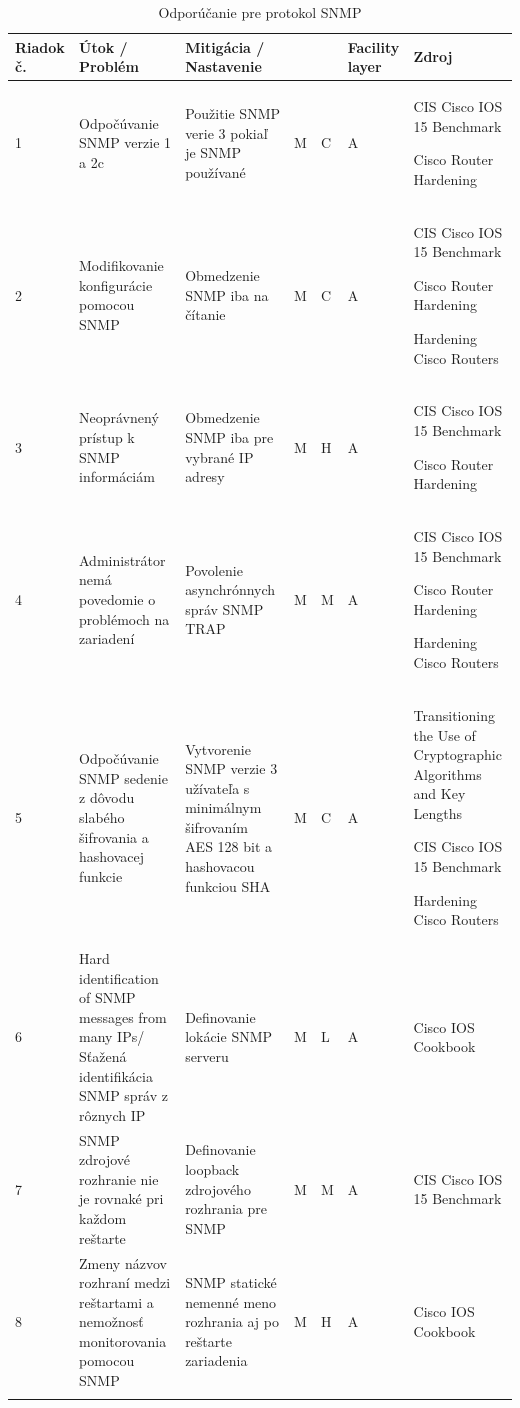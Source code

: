 \begin{longtable}[!htbp]{|C{2.5em}L{9em}L{9em}C{2em}C{2.5em}C{7.5em}L{10em}|}
	
	\hline
	\centering
	
	Riadok č.	&Útok / Problém	&Mitigácia / Nastavenie	& 	&	&Facility layer	&Zdroj\\
	\endhead
	
	 1	&Odpočúvanie SNMP verzie 1 a 2c	&Použitie SNMP verie 3 pokiaľ je SNMP používané	&M	&C	&A	&CIS Cisco IOS 15 Benchmark \cite{CIS_DrTLsgXv24lxeIIM}
	
	Cisco Router Hardening \cite{Graesser2001}\\
	2	&Modifikovanie konfigurácie pomocou SNMP	&Obmedzenie SNMP iba na čítanie	&M	&C	&A	&CIS Cisco IOS 15 Benchmark \cite{CIS_DrTLsgXv24lxeIIM}
	
	Cisco Router Hardening \cite{Graesser2001}
	
	Hardening Cisco Routers \cite{Akin2002}\\
	 3	&Neoprávnený prístup k SNMP informáciám	&Obmedzenie SNMP iba pre vybrané IP adresy	&M	&H	&A	&CIS Cisco IOS 15 Benchmark \cite{CIS_DrTLsgXv24lxeIIM}
	
	Cisco Router Hardening \cite{Graesser2001}\\
	4	&Administrátor nemá povedomie o problémoch na zariadení	&Povolenie asynchrónnych správ SNMP TRAP	&M	&M	&A	&CIS Cisco IOS 15 Benchmark \cite{CIS_DrTLsgXv24lxeIIM}
	
	Cisco Router Hardening \cite{Graesser2001}
	
	Hardening Cisco Routers \cite{Akin2002}\\
	 5	&Odpočúvanie SNMP sedenie z dôvodu slabého šifrovania a hashovacej  funkcie	&Vytvorenie SNMP verzie 3 užívateľa s minimálnym šifrovaním AES 128 bit a hashovacou funkciou SHA	&M	&C	&A	&Transitioning the Use of Cryptographic Algorithms and Key Lengths \cite{Barker2019}
	
	CIS Cisco IOS 15 Benchmark \cite{CIS_DrTLsgXv24lxeIIM}
	
	Hardening Cisco Routers \cite{Akin2002}\\
	6	&Hard identification of SNMP messages from many IPs/ Sťažená identifikácia SNMP správ z rôznych IP	&Definovanie lokácie SNMP serveru	&M	&L	&A	&Cisco IOS Cookbook \cite{Dooley2007}\\
	 7	&SNMP zdrojové rozhranie nie je rovnaké pri každom reštarte	& Definovanie loopback zdrojového rozhrania pre SNMP	&M	&M	&A	&CIS Cisco IOS 15 Benchmark \cite{CIS_DrTLsgXv24lxeIIM}\\
	8	&Zmeny názvov rozhraní medzi reštartami a nemožnosť monitorovania pomocou SNMP	&SNMP statické nemenné meno rozhrania aj po reštarte zariadenia	&M	&H	&A	&Cisco IOS Cookbook \cite{Dooley2007}\\
	
	\hline
	\caption{Odporúčanie pre protokol SNMP}
	\label{tab:snmp}%
\end{longtable}%

